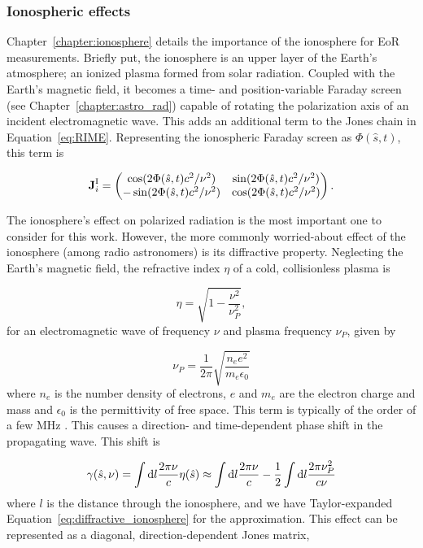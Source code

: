 \subsubsection{Ionospheric effects}

Chapter~\ref{chapter:ionosphere} details the importance of the ionosphere for EoR measurements. Briefly put, the ionosphere is an upper layer of the Earth's atmosphere; an ionized plasma formed from solar radiation. Coupled with the Earth's magnetic field, it becomes a time- and position-variable Faraday screen (see Chapter~\ref{chapter:astro_rad}) capable of rotating the polarization axis of an incident electromagnetic wave. This adds an additional term to the Jones chain in Equation~\ref{eq:RIME}. Representing the ionospheric Faraday screen as $\Phi (\hat{s},t)$, this term is

\begin{equation}
\textbf{J}_i^{\rm I} = 
\begin{pmatrix}
\cos(2\Phi(\hat{s},t)c^2/\nu^2) & \sin(2\Phi(\hat{s},t)c^2/\nu^2) \\
-\sin(2\Phi(\hat{s},t)c^2/\nu^2) & \cos(2\Phi(\hat{s},t)c^2/\nu^2)\\
\end{pmatrix}.
\end{equation}

The ionosphere's effect on polarized radiation is the most important one to consider for this work. However, the more commonly worried-about effect of the ionosphere (among radio astronomers) is its diffractive property. Neglecting the Earth's magnetic field, the refractive index $\eta$ of a cold, collisionless plasma is \citep{TMS}

\begin{equation}
\eta = \sqrt{1 - \frac{\nu^2}{\nu_P^2}},
\label{eq:diffractive_ionosphere}
\end{equation}
for an electromagnetic wave of frequency $\nu$ and plasma frequency $\nu_P$, given by

\begin{equation}
\nu_P = \frac{1}{2\pi}\sqrt{\frac{n_e e^2}{m_e\epsilon_0}}
\end{equation}
where $n_e$ is the number density of electrons, $e$ and $m_e$ are the electron charge and mass and $\epsilon_0$ is the permittivity of free space. This term is typically of the order of a few MHz \citep{Vedantham.15}. This causes a direction- and time-dependent phase shift in the propagating wave. This shift is 

\begin{equation}
\gamma(\hat{s},\nu) = \int {\rm d}l \frac{2\pi\nu}{c}\eta(\hat{s}) \approx \int {\rm d}l \frac{2\pi\nu}{c} - \frac{1}{2}\int {\rm d}l \frac{2\pi\nu_P^2}{c\nu}
\end{equation}
where $l$ is the distance through the ionosphere, and we have Taylor-expanded Equation~\ref{eq:diffractive_ionosphere} for the approximation. This effect can be represented as a diagonal, direction-dependent Jones matrix,

